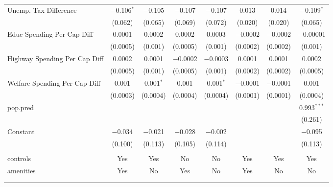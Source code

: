 \begin{table}[!htbp]
\begin{tabular}{@{\extracolsep{5pt}}lccccccc}
  Unemp. Tax Difference & $-$0.106$^{*}$ & $-$0.105 & $-$0.107 & $-$0.107 & 0.013 & 0.014 & $-$0.109$^{*}$ \\ 
  & (0.062) & (0.065) & (0.069) & (0.072) & (0.020) & (0.020) & (0.065) \\ 
  Educ Spending Per Cap Diff & 0.0001 & 0.0002 & 0.0002 & 0.0003 & $-$0.0002 & $-$0.0002 & $-$0.00001 \\ 
  & (0.0005) & (0.001) & (0.0005) & (0.001) & (0.0002) & (0.0002) & (0.001) \\ 
  Highway Spending Per Cap Diff & 0.0002 & 0.0001 & $-$0.0002 & $-$0.0003 & 0.0001 & 0.0001 & 0.0002 \\ 
  & (0.0005) & (0.001) & (0.0005) & (0.001) & (0.0002) & (0.0002) & (0.0005) \\ 
  Welfare Spending Per Cap Diff & 0.001 & 0.001$^{*}$ & 0.001 & 0.001$^{*}$ & $-$0.0001 & $-$0.0001 & 0.001 \\ 
  & (0.0003) & (0.0004) & (0.0004) & (0.0004) & (0.0001) & (0.0001) & (0.0004) \\ 
  pop.pred &  &  &  &  &  &  & 0.993$^{***}$ \\ 
  &  &  &  &  &  &  & (0.261) \\ 
  Constant & $-$0.034 & $-$0.021 & $-$0.028 & $-$0.002 &  &  & $-$0.095 \\ 
  & (0.100) & (0.113) & (0.105) & (0.114) &  &  & (0.113) \\ 
 \hline \\[-1.8ex] 
controls & Yes & Yes & No & No & Yes & Yes & Yes \\ 
amenities & Yes & No & Yes & No & Yes & No & No \\ 
\hline \\[-1.8ex] 
\hline 
\hline \\[-1.8ex] 
\end{tabular} 
\end{table} 
